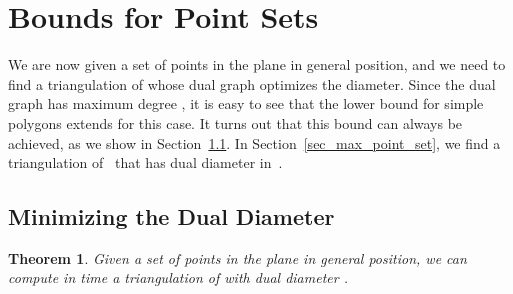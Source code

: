 \documentclass{article}
\newtheorem{theorem}{Theorem}[section]
\begin{document}
\section{Bounds for Point Sets}\label{sec_points}
We are now given a set  of  points
in the plane in general position, and we need to find a triangulation
of  whose dual graph optimizes the diameter.
Since the dual graph has maximum degree , it is easy to see that 
the  lower bound for simple polygons extends 
for this case.
It turns out that this bound can always be achieved, as we show in 
Section~\ref{sec_min_point_set}.
In Section~\ref{sec_max_point_set}, we find a triangulation of~ that 
has dual diameter in~.

\subsection{Minimizing the Dual Diameter}\label{sec_min_point_set}

\begin{theorem}\label{theo_pointset}
Given a set  of  points in the plane in general position, we can
compute in  time a triangulation
of  with dual diameter .
\end{theorem}
\end{document}
